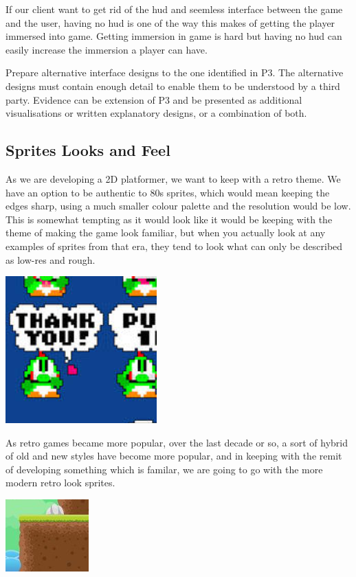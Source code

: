 \documentclass{article}
\begin{document}
If our client want to get rid of the hud and seemless interface between the game and the user, having no hud is one of the way this makes of getting the player immersed into game. Getting immersion in game is hard but having no hud can easily increase the immersion a player can have.



Prepare alternative interface designs to the one identified in P3. The alternative designs must contain enough detail to enable them to be understood by a third party. Evidence can be extension of P3 and be presented as additional visualisations or written explanatory designs, or a combination of both.


\subsection{ Sprites Looks and Feel }
As we are developing a 2D platformer, we want to keep with a retro theme. We have an option to be authentic to 80s sprites, which would mean keeping the edges sharp, using a much smaller colour palette and the resolution would be low.
This is somewhat tempting as it would look like it would be keeping with the theme of making the game look familiar, but when you actually look at any examples of sprites from that era, they tend to look what can only be described as low-res and rough.

\includegraphics[scale=0.5]{TraditionalSprite}

As retro games became more popular, over the last decade or so, a sort of hybrid of old and new styles have become more popular, and in keeping with the remit of developing something which is familar, we are going to go with the more modern retro look sprites.

\includegraphics[scale=0.5]{SoftSprite}
\end{document}
